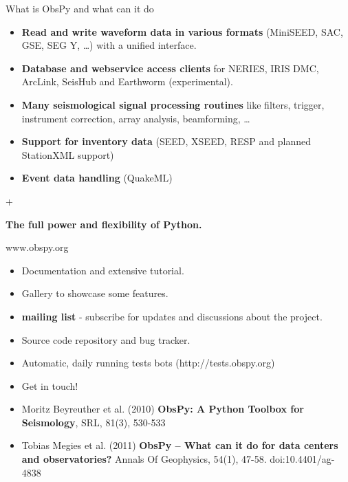 \documentclass[handout]{beamer}
\begin{document}
\begin{frame}{What is ObsPy and what can it do}
    \begin{itemize}
        \item \textbf{Read and write waveform data in various formats} (MiniSEED, SAC, GSE, SEG Y, \dots) with a unified interface.
        \item \textbf{Database and webservice access clients} for NERIES, IRIS DMC, ArcLink, SeisHub and Earthworm (experimental).
        \item \textbf{Many seismological signal processing routines} like filters, trigger, instrument correction, array analysis, beamforming, \dots
        \item \textbf{Support for inventory data} (SEED, XSEED, RESP and planned StationXML support)
        \item \textbf{Event data handling} (QuakeML)
    \end{itemize}
    \begin{center}
        +
    \end{center}

    \begin{center}
        \textbf{The full power and flexibility of Python.}
    \end{center}

\end{frame}


\begin{frame}[plain]{www.obspy.org}
    \begin{itemize}
        \item Documentation and extensive tutorial.
        \item Gallery to showcase some features.
        \item \textbf{mailing list} - subscribe for updates and discussions about the project.
        \item Source code repository and bug tracker.
        \item Automatic, daily running tests bots (http://tests.obspy.org)
        \item Get in touch!
    \end{itemize}

    \vspace{2em}

    \small
    \begin{itemize}
        \item Moritz Beyreuther et al. (2010) \textbf{ObsPy: A Python Toolbox for Seismology}, SRL, 81(3), 530-533
        \item Tobias Megies et al. (2011) \textbf{ObsPy – What can it do for data centers and observatories?} Annals Of Geophysics, 54(1), 47-58. doi:10.4401/ag-4838
    \end{itemize}
\end{frame}
\end{document}
